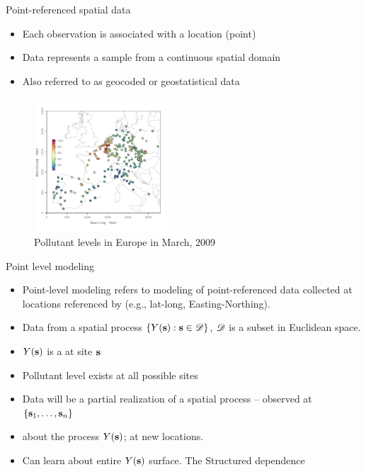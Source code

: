 \begin{frame}{Point-referenced spatial data}
	\begin{itemize}
				\item Each observation  is associated with a location (point) 
				\item Data represents a sample from a continuous spatial domain
				\item Also referred to as \alert {geocoded} or \alert {geostatistical} data
			\end{itemize}

		\begin{figure}
			\begin{center}
				\vskip -5mm\includegraphics[width=5cm]{../figures/march-obs.pdf}
				\caption{Pollutant levels in Europe in March, 2009}
			\end{center}
		\end{figure}
\end{frame}

\begin{frame}{Point level modeling}
	\begin{itemize}
		\item \alert{Point-level modeling} refers to modeling of point-referenced data collected at locations referenced by  (e.g., lat-long, Easting-Northing). %
		
		\item Data from a spatial process $\{Y(\textbf{s}):\textbf{s} \in {\cal D}\}$, ${\cal D}$ is a subset in
		Euclidean space. %
		
		\item {} $Y(\textbf{s})$ is a  at site $\textbf{s}$ %
		
		\item {} Pollutant level exists at all possible sites %
		
		\item {} Data will be a partial realization of a spatial process -- observed at $\{\textbf{s}_1,\ldots,\textbf{s}_n\}$ %
		
		\item {}  about the process $Y(\textbf{s})$;  at new locations.
		
		\item {} Can learn about entire $Y(\textbf{s})$ surface.  The  Structured dependence
	\end{itemize}
\end{frame}

